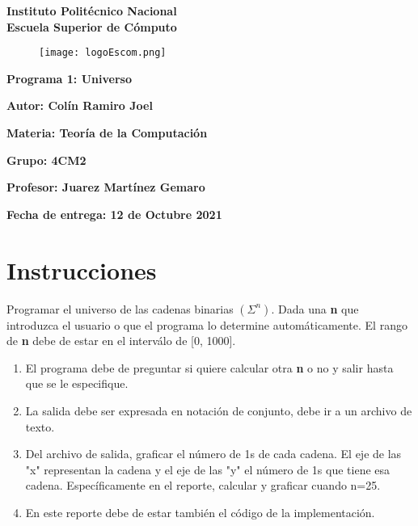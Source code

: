 \documentclass{article}
\begin{document}
	\begin{titlepage}
		\begin{center}
			{\huge\textbf{Instituto Politécnico Nacional}}\\
			\vspace{7mm}
			{\huge\textbf{Escuela Superior de Cómputo}}\\			
			\begin{figure}[h]
				\centering
				\texttt{[image: logoEscom.png]}
			\end{figure}	
			\vspace{1cm}
			{\huge\textbf{Programa 1: Universo}}
			\par\vspace{2cm}
			\large\textbf{Autor: Colín Ramiro Joel}
			\par\vspace{1cm}
			{\large\textbf{Materia: Teoría de la Computación}}
			\par\vspace{1cm}
			{\large\textbf{Grupo: 4CM2}}
			\par\vspace{1cm}
			{\large\textbf{Profesor: Juarez Martínez Gemaro}}
			\par\vspace{1cm}
			{\large\textbf{Fecha de entrega: {\huge{12 de Octubre 2021}}}}
			\par\vspace{3cm}
			\end{center}
	\end{titlepage}	
	\section*{Instrucciones}
	Programar el universo de las cadenas binarias $(\Sigma^n)$. Dada una {\bf n} que introduzca el usuario o que el programa lo determine automáticamente. El rango de {\bf n} debe de estar en el interválo de [0, 1000].
	\begin{enumerate}
		\item El programa debe de preguntar si quiere calcular otra {\bf n} o no y salir hasta que se le especifique. 
		\item La salida debe ser expresada en notación de conjunto, debe ir a un archivo de texto.
		\item Del archivo de salida, graficar el número de 1s de cada cadena. El eje de las "x" representan la cadena y el eje de las "y" el número de 1s que tiene esa cadena. Específicamente en el reporte, calcular y graficar cuando n=25.
		\item En este reporte debe de estar también el código de la implementación.
	\end{enumerate}	
\end{document}
